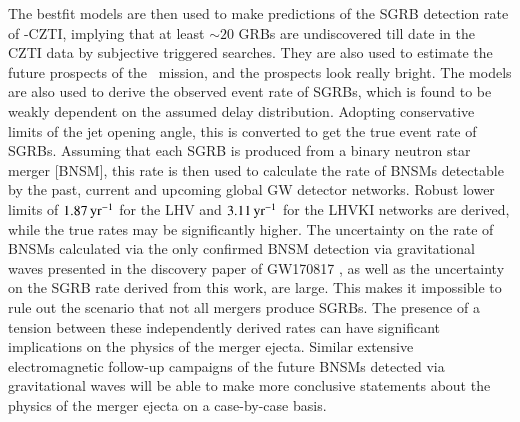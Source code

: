 The bestfit models are then used to make predictions of the SGRB detection rate of \AS -CZTI, implying that at least $\sim 20$ GRBs are undiscovered till date in the CZTI data by subjective triggered searches. They are also used to estimate the future prospects of the \D\ mission, and the prospects look really bright. The models are also used to derive the observed event rate of SGRBs, which is found to be weakly dependent on the assumed delay distribution. Adopting conservative limits of the jet opening angle, this is converted to get the true event rate of SGRBs. Assuming that each SGRB is produced from a binary neutron star merger [BNSM], this rate is then used to calculate the rate of BNSMs detectable by the past, current and upcoming global GW detector networks. Robust lower limits of $1.87 \, {\rm yr^{-1}}$ for the LHV and $3.11 \, {\rm yr^{-1}}$ for the LHVKI networks are derived, while the true rates may be significantly higher. The uncertainty on the rate of BNSMs calculated via the only confirmed BNSM detection via gravitational waves presented in the discovery paper of GW170817 \citep{GW170817-2017}, as well as the uncertainty on the SGRB rate derived from this work, are large. This makes it impossible to rule out the scenario that not all mergers produce SGRBs. The presence of a tension between these independently derived rates can have significant implications on the physics of the merger ejecta. Similar extensive electromagnetic follow-up campaigns of the future BNSMs detected via gravitational waves will be able to make more conclusive statements about the physics of the merger ejecta on a case-by-case basis.
